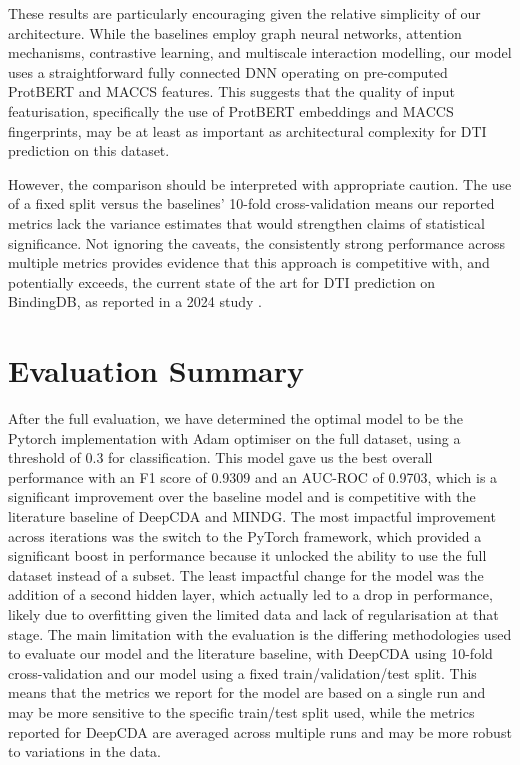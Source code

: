 These results are particularly encouraging given the relative simplicity of our architecture.
While the baselines employ graph neural networks, attention mechanisms, contrastive learning, and multiscale interaction modelling, our model uses a straightforward fully connected DNN operating on pre-computed ProtBERT and MACCS features.
This suggests that the quality of input featurisation, specifically the use of ProtBERT embeddings and MACCS fingerprints, may be at least as important as architectural complexity for DTI prediction on this dataset.

However, the comparison should be interpreted with appropriate caution.
The use of a fixed split versus the baselines' 10-fold cross-validation means our reported metrics lack the variance estimates that would strengthen claims of statistical significance.
Not ignoring the caveats, the consistently strong performance across multiple metrics provides evidence that this approach is competitive with, and potentially exceeds, the current state of the art for DTI prediction on BindingDB, as reported in a 2024 study \citep{Yang2024}.
\section{Evaluation Summary}
\label{sec: eval_summary}
After the full evaluation, we have determined the optimal model to be the Pytorch implementation with Adam optimiser on the full dataset, using a threshold of 0.3 for classification.
This model gave us the best overall performance with an F1 score of 0.9309 and an AUC-ROC of 0.9703, which is a significant improvement over the baseline model and is competitive with the literature baseline of DeepCDA and MINDG.
The most impactful improvement across iterations was the switch to the PyTorch framework, which provided a significant boost in performance because it unlocked the ability to use the full dataset instead of a subset.
The least impactful change for the model was the addition of a second hidden layer, which actually led to a drop in performance, likely due to overfitting given the limited data and lack of regularisation at that stage.
The main limitation with the evaluation is the differing methodologies used to evaluate our model and the literature baseline, with DeepCDA using 10-fold cross-validation and our model using a fixed train/validation/test split.
This means that the metrics we report for the model are based on a single run and may be more sensitive to the specific train/test split used, while the metrics reported for DeepCDA are averaged across multiple runs and may be more robust to variations in the data.
